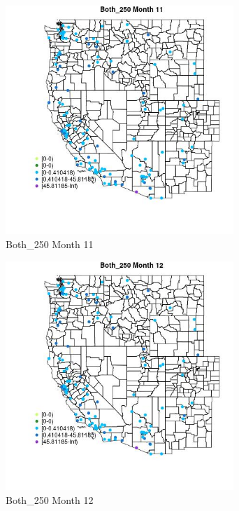 \begin{figure} 
\centering  
\includegraphics[width=0.77\textwidth]{Code_Outputs/Report_ML_input_PM25_Step4_part_e_de_duplicated_aves_MapObsMo11Both_250.jpg} 
\caption{\label{fig:Report_ML_input_PM25_Step4_part_e_de_duplicated_avesMapObsMo11Both_250}Both_250 Month 11} 
\end{figure} 
 

\begin{figure} 
\centering  
\includegraphics[width=0.77\textwidth]{Code_Outputs/Report_ML_input_PM25_Step4_part_e_de_duplicated_aves_MapObsMo12Both_250.jpg} 
\caption{\label{fig:Report_ML_input_PM25_Step4_part_e_de_duplicated_avesMapObsMo12Both_250}Both_250 Month 12} 
\end{figure} 
 

